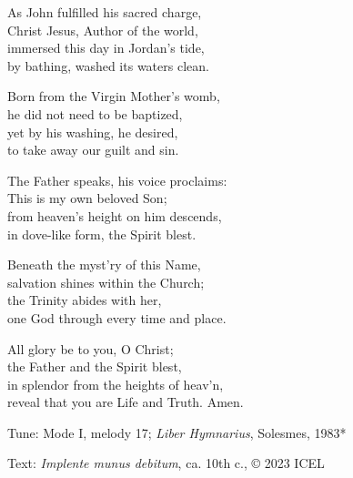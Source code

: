 \hymn

\settowidth{\versewidth}{reveal that you are Life and Truth. Amen.}

\begin{hymnverse}%
As John fulfilled his sacred charge,\\
Christ Jesus, Author of the world,\\
immersed this day in Jordan’s tide,\\
by bathing, washed its waters clean.

Born from the Virgin Mother’s womb,\\
he did not need to be baptized,\\
yet by his washing, he desired,\\
to take away our guilt and sin.

The Father speaks, his voice proclaims:\\
This is my own beloved Son;\\
from heaven’s height on him descends,\\
in dove-like form, the Spirit blest.

Beneath the myst’ry of this Name,\\
salvation shines within the Church;\\
the Trinity abides with her,\\
one God through every time and place.

All glory be to you, O Christ;\\
the Father and the Spirit blest,\\
in splendor from the heights of heav’n,\\
reveal that you are Life and Truth. Amen.
\end{hymnverse}

\begin{hymnsource}
Tune: Mode I, melody 17; \emph{Liber Hymnarius}, Solesmes, 1983*

Text: \emph{Implente munus debitum}, ca. 10th c., © 2023 ICEL




\end{hymnsource}